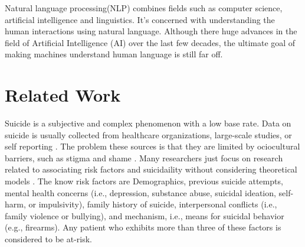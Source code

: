 Natural language processing(NLP) combines fields such as computer science, artificial intelligence and linguistics. It's concerned with understanding the human interactions using natural language. Although there huge advances in the field of Artificial Intelligence (AI) over the last few decades, the ultimate goal of making machines understand human language is still far off. 

\section{Related Work}

Suicide is a subjective and complex phenomenon with a low base rate. Data on suicide is usually collected from healthcare organizations, large-scale studies, or self reporting \cite{crosby2011self,horowitz2009suicide}. The problem these sources is that they are limited by ociocultural barriers, such as stigma and shame \cite{crosby2011self}. Many researchers just focus on research related to associating risk factors and suicidaility without considering theoretical models \cite{nock2008suicide}. The know risk factors are Demographics, previous suicide attempts, mental health concerns (i.e., depression, substance abuse, suicidal ideation, self-harm, or impulsivity), family history of suicide, interpersonal conflicts (i.e., family violence or bullying), and mechanism, i.e., means for suicidal behavior (e.g., firearms). Any patient who exhibits more than three of these factors is considered to be at-risk.


